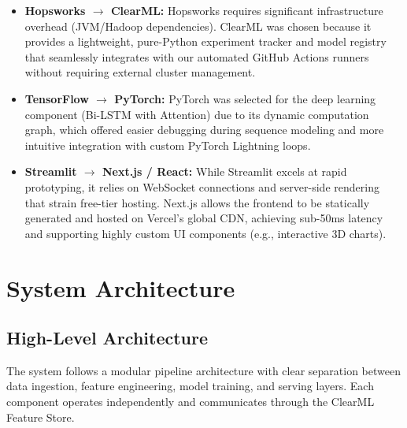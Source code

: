 \documentclass[12pt, a4paper, oneside]{article}
\begin{document}
\begin{itemize}
    \item \textbf{Hopsworks $\rightarrow$ ClearML:} Hopsworks requires significant infrastructure overhead (JVM/Hadoop dependencies). ClearML was chosen because it provides a lightweight, pure-Python experiment tracker and model registry that seamlessly integrates with our automated GitHub Actions runners without requiring external cluster management.
    \item \textbf{TensorFlow $\rightarrow$ PyTorch:} PyTorch was selected for the deep learning component (Bi-LSTM with Attention) due to its dynamic computation graph, which offered easier debugging during sequence modeling and more intuitive integration with custom PyTorch Lightning loops.
    \item \textbf{Streamlit $\rightarrow$ Next.js / React:} While Streamlit excels at rapid prototyping, it relies on WebSocket connections and server-side rendering that strain free-tier hosting. Next.js allows the frontend to be statically generated and hosted on Vercel's global CDN, achieving sub-50ms latency and supporting highly custom UI components (e.g., interactive 3D charts).
\end{itemize}

\section{System Architecture}

\subsection{High-Level Architecture}

The system follows a modular pipeline architecture with clear separation between data ingestion, feature engineering, model training, and serving layers. Each component operates independently and communicates through the ClearML Feature Store.
\end{document}
